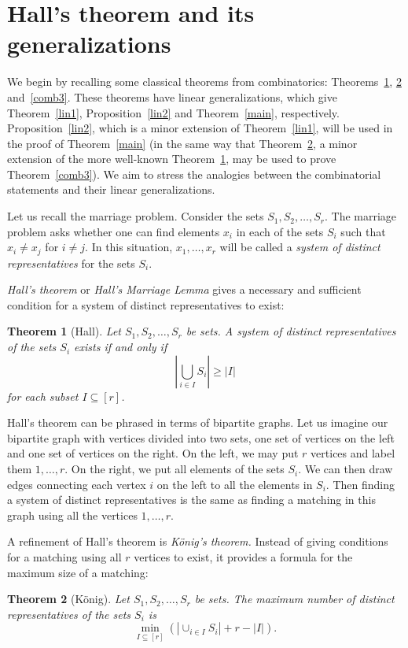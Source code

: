 \documentclass[10pt]{amsart}
\newtheorem{theorem}{Theorem}[section]
\theoremstyle{definition}
\begin{document}
\section{Hall's theorem and its generalizations}\label{sect2}

We begin by recalling some classical theorems from combinatorics: Theorems~\ref{comb1}, \ref{comb2} and~\ref{comb3}. These theorems have linear generalizations, which give Theorem~\ref{lin1}, Proposition~\ref{lin2} and Theorem~\ref{main}, respectively. Proposition~\ref{lin2}, which is a minor extension of Theorem~\ref{lin1}, will be used in the proof of Theorem~\ref{main} (in the same way that Theorem~\ref{comb2}, a minor extension of the more well-known Theorem~\ref{comb1}, may be used to prove Theorem~\ref{comb3}). We aim to stress the analogies between the combinatorial statements and their linear generalizations.

Let us recall the marriage problem. Consider the sets $S_1, S_2, \dots, S_r$. The marriage problem asks whether one can find elements $x_i$ in each of the sets $S_i$ such that $x_i \neq x_j$ for $i \neq j$. In this situation, $x_1, \dots, x_r$ will be called a \emph{system of distinct representatives} for the sets $S_i$.

\emph{Hall's theorem} or \emph{Hall's Marriage Lemma} gives a necessary and sufficient condition for a system of distinct representatives to exist:
\begin{theorem}[Hall] \label{comb1}
Let $S_1,S_2,\ldots,S_r$ be sets. A system of distinct representatives of the sets $S_i$ exists if and only if
\[
 \left|\bigcup_{i \in I} S_i\right| \geq |I| %
\]
for each subset $I \subseteq [r]$.
\end{theorem}

Hall's theorem can be phrased in terms of bipartite graphs. Let us imagine our bipartite graph with vertices divided into two sets, one set of vertices on the left and one set of vertices on the right. On the left, we may put $r$ vertices and label them $1, \dots, r$. On the right, we put all elements of the sets $S_i$. We can then draw edges connecting each vertex $i$ on the left to all the elements in $S_i$. Then finding a system of distinct representatives is the same as finding a matching in this graph using all the vertices $1, \dots, r$.

A refinement of Hall's theorem is \emph{K{\"o}nig's theorem.} Instead of giving conditions for a matching using all $r$ vertices to exist, it provides a formula for the maximum size of a matching:
\begin{theorem}[K{\"o}nig] \label{comb2}
Let $S_1,S_2, \dots,S_r$ be sets. The maximum number of distinct representatives of the sets $S_i$ is
\[
 \min_{I \subseteq [r]} \left( \left| \cup_{i\in I} S_i \right| + r - |I| \right). 
\]
\end{theorem}
\end{document}
